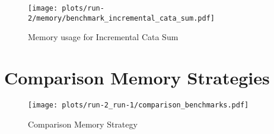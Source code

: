 \begin{figure}[H]
    \centering
    \texttt{[image: plots/run-2/memory/benchmark\_incremental\_cata\_sum.pdf]}
    \caption{Memory usage for Incremental Cata Sum}
    \label{fig-bytes-all-inc-cata-sum}
\end{figure}

\section{Comparison Memory Strategies}
\begin{figure}[H]
    \centering
    \texttt{[image: plots/run-2\_run-1/comparison\_benchmarks.pdf]}
    \caption{Comparison Memory Strategy}
    \label{fig-comp-mem-strat}
\end{figure}
